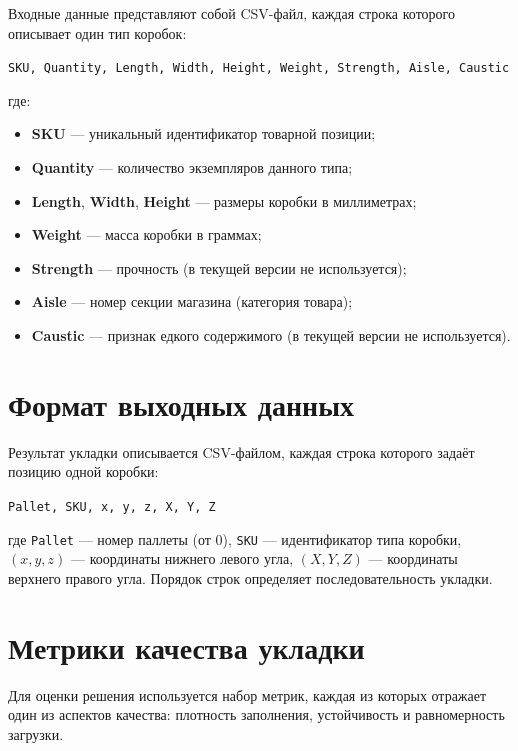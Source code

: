 Входные данные представляют собой CSV-файл, каждая строка которого описывает один тип коробок:

\begin{center}
\texttt{SKU, Quantity, Length, Width, Height, Weight, Strength, Aisle, Caustic}
\end{center}

\noindent где:
\begin{itemize}
  \item \textbf{SKU} --- уникальный идентификатор товарной позиции;
  \item \textbf{Quantity} --- количество экземпляров данного типа;
  \item \textbf{Length}, \textbf{Width}, \textbf{Height} --- размеры коробки в миллиметрах;
  \item \textbf{Weight} --- масса коробки в граммах;
  \item \textbf{Strength} --- прочность (в текущей версии не используется);
  \item \textbf{Aisle} --- номер секции магазина (категория товара);
  \item \textbf{Caustic} --- признак едкого содержимого (в текущей версии не используется).
\end{itemize}

\section{Формат выходных данных}
\label{sec:output_format}

Результат укладки описывается CSV-файлом, каждая строка которого задаёт позицию одной коробки:

\begin{center}
\texttt{Pallet, SKU, x, y, z, X, Y, Z}
\end{center}

\noindent где \texttt{Pallet} --- номер паллеты (от 0), \texttt{SKU} --- идентификатор типа коробки, $(x, y, z)$ --- координаты нижнего левого угла, $(X, Y, Z)$ --- координаты верхнего правого угла. Порядок строк определяет последовательность укладки.

\section{Метрики качества укладки}

Для оценки решения используется набор метрик, каждая из которых отражает один из аспектов качества: плотность заполнения, устойчивость и равномерность загрузки.

